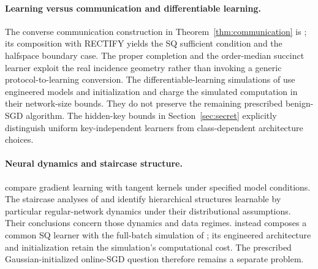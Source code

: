 \paragraph{Learning versus communication and differentiable learning.}
The converse communication construction in Theorem~\ref{thm:communication} is \citet[Proposition~3.14]{HHPTZ22}; its composition with RECTIFY yields the SQ sufficient condition and the halfspace boundary case. The proper completion and the order-median succinct learner exploit the real incidence geometry rather than invoking a generic protocol-to-learning conversion. The differentiable-learning simulations of \citet{AKMSS21} use engineered models and initialization and charge the simulated computation in their network-size bounds. They do not preserve the remaining prescribed benign-SGD algorithm. The hidden-key bounds in Section~\ref{sec:secret} explicitly distinguish uniform key-independent learners from class-dependent architecture choices.


\paragraph{Neural dynamics and staircase structure.}
\citet{MKAS21} compare gradient learning with tangent kernels under specified model conditions. The staircase analyses of \citet{ABBBN21} and \citet{ABM22} identify hierarchical structures learnable by particular regular-network dynamics under their distributional assumptions. Their conclusions concern those dynamics and data regimes.  instead composes a common SQ learner with the full-batch simulation of \citet{AKMSS21}; its engineered architecture and initialization retain the simulation's computational cost. The prescribed Gaussian-initialized online-SGD question therefore remains a separate problem.
